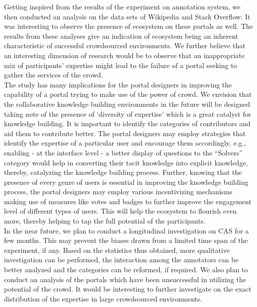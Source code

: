 \documentclass{llncs}
\begin{document}
Getting inspired from the results of the experiment on annotation system, we then conducted an analysis on the data sets of Wikipedia and Stack Overflow. It was interesting to observe the presence of ecosystem on these portals as well. The results from these analyses give an indication of ecosystem being an inherent characteristic of successful crowdsourced environments. We further believe that an interesting dimension of research would be to observe that an inappropriate mix of participants' expertise might lead to the failure of a portal seeking to gather the services of the crowd.\\

The study has many implications for the portal designers in improving the capability of a portal trying to make use of the power of crowd. We envision that the collaborative knowledge building environments in the future will be designed taking note of the presence of `diversity of expertise’ which is a great catalyst for knowledge building. It is important to identify the categories of contributors and aid them to contribute better. The portal designers may employ strategies that identify the expertise of a particular user and encourage them accordingly, e.g., enabling - at the interface level - a better display of questions to the ``Solvers'' category would help in converting their tacit knowledge into explicit knowledge, thereby, catalyzing the knowledge building process. Further, knowing that the presence of every genre of users is essential in improving the knowledge building process, the portal designers may employ various incentivizing mechanisms making use of measures like votes and badges to further improve the engagement level of different types of users. This will help the ecosystem to flourish even more, thereby helping to tap the full potential of the participants.\\

In the near future, we plan to conduct a longitudinal investigation on CAS for a few months. This may prevent the biases drawn from a limited time span of the experiment, if any. Based on the statistics thus obtained, more qualitative investigation can be performed, the interaction among the annotators can be better analyzed and the categories can be reformed, if required. We also plan to conduct an analysis of the portals which have been unsuccessful in utilizing the potential of the crowd. It would be interesting to further investigate on the exact distribution of the expertise in large crowdsourced environments.
\end{document}
